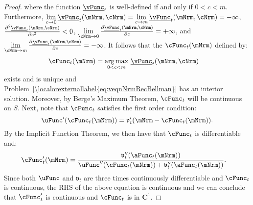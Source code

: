 \documentclass[\econtexRoot/BufferStockTheory]{subfiles}
\begin{document}
\begin{proof}
where the function $\underline{\vFunc}_{t}$ is well-defined if and only if $0<c<m$.  Furthermore,
$\lim\limits_{c \rightarrow
  0}\underline{\vFunc}_{t}(\mNrm,\cNrm)=\lim\limits_{c\rightarrow m} \underline{\vFunc}_{t}(\mNrm,\cNrm)=-\infty $, $\frac{\partial ^{2}\underline{\vFunc}_{t}(\mNrm,\cNrm)}{\partial c^{2}}%
<0$, $\lim\limits_{\cNrm \rightarrow 0}\frac{\partial \underline{\vFunc}_{t}(\mNrm,\cNrm)}{\partial c}%
=+\infty $, and $\lim\limits_{\cNrm\rightarrow m} \frac{\partial \underline{\vFunc}_{t}(\mNrm,\cNrm)}{%
  \partial c}=-\infty $. It follows that the $\cFunc_{t}(\mNrm)$ defined by:
\begin{equation}\begin{gathered}\begin{aligned}
      \cFunc_{t}(\mNrm)  & = \underset{0<c<m}{\arg \max }~\underline{\vFunc}_{t}(\mNrm,\cNrm)
    \end{aligned}\end{gathered}\end{equation}
exists and is unique and Problem~\eqref{\localorexternallabel{eq:veqnNrmRecBellman}} has an interior
solution. Moreover, by Berge's Maximum Theorem, $\cFunc_{t}$ will be continuous on $S$. Next, note that $\cFunc_{t}$ satisfies the first order condition:
%
%
%
\begin{equation}
  \uFunc^{\prime }(\cFunc_{t}(\mNrm))=\mathfrak{v}_{t}^{\prime }(\mNrm-\cFunc_{t}(\mNrm))  \label{eq:consumptionf}.
\end{equation}
%
%
By the Implicit Function Theorem, we then have that $\cFunc_{t}$ is differentiable and:
%
%
\begin{equation}\label{eq:derivativeConsFunc}\begin{gathered}\begin{aligned}
      \cFunc_{t}^{\prime }(\mNrm)  & = \frac{\mathfrak{v}_{t}^{\prime \prime }({\aFunc}_{t}(\mNrm))  }{\uFunc^{\prime \prime }(\cFunc_{t}(\mNrm))+\mathfrak{v}_{t}^{\prime \prime }({\aFunc}_{t}(\mNrm))}.
    \end{aligned}\end{gathered}\end{equation}
%
%
Since both $\uFunc$ and $\mathfrak{v}_{t}$ are
three times continuously differentiable and $\cFunc_{t}$ is continuous, the RHS of the above equation is continuous and we can conclude that
$\cFunc_{t}^{\prime }$ is continuous and $\cFunc_{t}$ is in $\mathbf{C}^{1}$. 


\end{proof}
\end{document}
